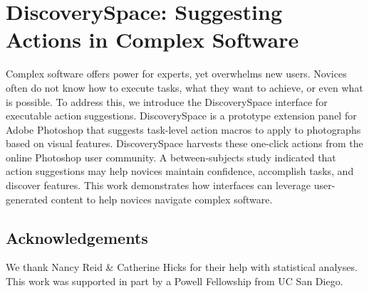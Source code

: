 \chapter{DiscoverySpace: Suggesting Actions in Complex Software}
Complex software offers power for experts, yet overwhelms new users. Novices often do not know how to execute tasks, what they want to achieve, or even what is possible. To address this, we introduce the Discovery\-Space interface for executable action suggestions. Discovery\-Space is a prototype extension panel for Adobe Photoshop that suggests task-level action macros to apply to photographs based on visual features. Discovery\-Space harvests these one-click actions from the online Photoshop user community. A between-subjects study indicated that action suggestions may help novices maintain confidence, accomplish tasks, and discover features. This work demonstrates how interfaces can leverage user-generated content to help novices navigate complex software.











\section{Acknowledgements}
We thank Nancy Reid \& Catherine Hicks for their help with statistical analyses. This work was supported in part by a Powell Fellowship from UC San Diego.